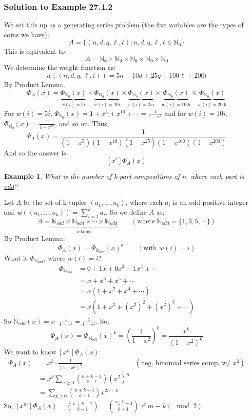 \documentclass{report}
\newtheorem{ex}{Example}[section]
\begin{document}
\subsubsection{Solution to Example 27.1.2}
We set this up as a generating series problem (the five variables are the types of coins we have):
$$A = \{(n, d, q, \ell, t): n, d,q, \ell, t \in \mathbb{N}_0\}$$
This is equivalent to
$$A = \mathbb{N}_0 \times \mathbb{N}_0 \times \mathbb{N}_0 \times \mathbb{N}_0 \times \mathbb{N}_0 $$
We determine the weight function as:
$$w((n, d, q, \ell, t)) = 5n + 10d + 25q + 100\ell + 200t$$
By Product Lemma,
$$\Phi_{A}(x) = \underbrace{\Phi_{\mathbb{N}_0}(x)}_{w(i) = 5i} \times 
\underbrace{\Phi_{\mathbb{N}_0}(x)}_{w(i) = 10i} \times
\underbrace{\Phi_{\mathbb{N}_0}(x)}_{w(i) = 25i} \times
\underbrace{\Phi_{\mathbb{N}_0}(x)}_{w(i) = 100i} \times
\underbrace{\Phi_{\mathbb{N}_0}(x)}_{w(i) = 200i}$$
For $w(i) = 5i$, $\Phi_{\mathbb{N}_0}(x) = 1 + x^5 + x^{10} + \cdots = \frac{1}{1-x^5}$ and for $w(i) = 10i$, $\Phi_{\mathbb{N}_0}(x) = \frac{1}{1-x^{10}}$, and so on. Thus,
$$\Phi_{A}(x) = \frac{1}{(1-x^5)(1-x^{10})(1-x^{25})(1-x^{100})(1-x^{200})}$$
And so the answer is
$$[x^c]\Phi_{A}(x)$$
\begin{ex}
What is the number of k-part compositions of n, where each part is \underline{odd}?
\end{ex}
Let $A$ be the set of k-tuples $(a_1, \ldots, a_k)$, where each $a_i$ is an odd positive integer and $w((a_1, \ldots, a_k)) = \displaystyle\sum_{i=1}^k a_i$. So we define $A$ as:
$$A = \underbrace{\mathbb{N}_{odd} \times  \mathbb{N}_{odd} \times \cdots \times \mathbb{N}_{odd}}_{k \text{ times}} \qquad (\text{where } \mathbb{N}_{odd} = \{1, 3, 5, \cdots\})$$
By Product Lemma:
$$\Phi_{A}(x) = \Phi_{\mathbb{N}_{odd}}(x)^k \qquad (\text{with }w(i) = i)$$
What is $\Phi_{\mathbb{N}_{odd}}$, where $w(i) = i$?
\begin{align*}
\Phi_{\mathbb{N}_{odd}} &= 0 + 1x + 0x^2 + 1x^3 + \cdots \\
&= x + x^3 + x^5 + \cdots\\
&= x(1 + x^2 + x^4 + \cdots) \\
&= x(1 + x^2 + {(x^2)}^2 + {(x^2)}^3 + \cdots)
\end{align*}
So $\mathbb{N}_{odd}(x) = x \cdot \frac{1}{1-x^2} = \frac{x}{1-x^2}$. So:
$$\Phi_{A}(x) = \Phi_{\mathbb{N}_{odd}}(x)^k = \left(\frac{1}{1-x^2}\right)^k = \frac{x^k}{(1-x^2)^k}$$
We want to know $[x^n]\Phi_{A}(x)$:
\begin{align*}
\Phi_A(x) &= x^k \cdot \frac{1}{(1-x^2)^k} & (\text{neg. binomial series comp. w/ } x^2)\\
&= x^k \sum_{n \geq 0} {n+k-1 \choose k-1}{(x^2)}^n\\
&= \sum_{k \geq 0} {n+k-1 \choose k-1}x^{2n + k}
\end{align*}
So, $[x^m]\Phi_A(x) = {n + k -1\choose k-1} = {\frac{m+k}{2}-1 \choose k-1}$ if $m \equiv k(\mod 2)$
\end{document}
